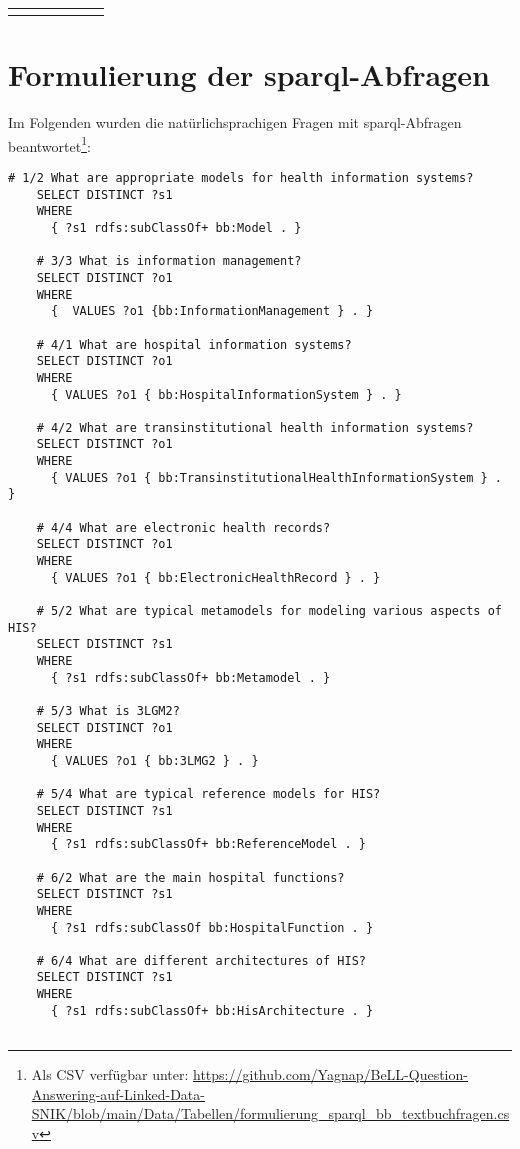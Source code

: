 \begin{longtable}{c p{6.5 cm} c c c c}
    \bottomrule \\
  \end{longtable}
  
\section[Formulierung der SPARQL-Abfragen]{Formulierung der \ac{sparql}-Abfragen}\label{sub:sparqltextbuchfragen}

Im Folgenden wurden die natürlichsprachigen Fragen mit \ac{sparql}-Abfragen beantwortet\footnote{Als CSV verfügbar unter:
\url{https://github.com/Yagnap/BeLL-Question-Answering-auf-Linked-Data-SNIK/blob/main/Data/Tabellen/formulierung\_sparql\_bb\_textbuchfragen.csv}}:

\begin{lstlisting}[language=SPARQL]
    # 1/2 What are appropriate models for health information systems?
    SELECT DISTINCT ?s1
    WHERE
      { ?s1 rdfs:subClassOf+ bb:Model . }
    
    # 3/3 What is information management?
    SELECT DISTINCT ?o1
    WHERE
      {  VALUES ?o1 {bb:InformationManagement } . }
    
    # 4/1 What are hospital information systems?
    SELECT DISTINCT ?o1
    WHERE
      { VALUES ?o1 { bb:HospitalInformationSystem } . }
    
    # 4/2 What are transinstitutional health information systems?
    SELECT DISTINCT ?o1
    WHERE
      { VALUES ?o1 { bb:TransinstitutionalHealthInformationSystem } . }
    
    # 4/4 What are electronic health records?
    SELECT DISTINCT ?o1
    WHERE
      { VALUES ?o1 { bb:ElectronicHealthRecord } . }
    
    # 5/2 What are typical metamodels for modeling various aspects of HIS?
    SELECT DISTINCT ?s1
    WHERE
      { ?s1 rdfs:subClassOf+ bb:Metamodel . }
    
    # 5/3 What is 3LGM2?
    SELECT DISTINCT ?o1
    WHERE
      { VALUES ?o1 { bb:3LMG2 } . }
    
    # 5/4 What are typical reference models for HIS?
    SELECT DISTINCT ?s1
    WHERE
      { ?s1 rdfs:subClassOf+ bb:ReferenceModel . }
    
    # 6/2 What are the main hospital functions?
    SELECT DISTINCT ?s1
    WHERE
      { ?s1 rdfs:subClassOf bb:HospitalFunction . }
    
    # 6/4 What are different architectures of HIS?
    SELECT DISTINCT ?s1
    WHERE
      { ?s1 rdfs:subClassOf+ bb:HisArchitecture . }
    

\end{lstlisting}
